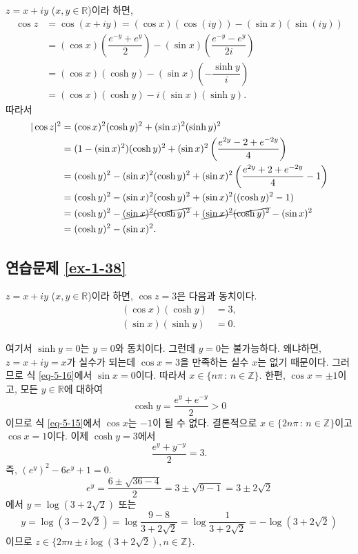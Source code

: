 $z=x+iy$ ($x,y\in\mathbb R$)이라 하면,
\begin{align*}
\cos z &= \cos(x+iy) = (\cos x)(\cos(iy)) - (\sin x)(\sin(iy)) \\
&= (\cos x)\left( \dfrac{e^{-y}+e^y}2\right)
- (\sin x)\left( \dfrac{e^{-y}-e^y}{2i}\right) \\
&= (\cos x)(\cosh y) - (\sin x)\left(-\dfrac{\sinh y}i\right) \\
&= (\cos x)(\cosh y) - i(\sin x)(\sinh y).
\end{align*}
따라서
\begin{align*}
|\cos z|^2 &= (\cos x)^2(\cosh y)^2 + (\sin x)^2(\sinh y)^2 \\
&= (1-(\sin x)^2)(\cosh y)^2 + (\sin x)^2\left(\dfrac{e^{2y} -2 + e^{-2y}}4\right) \\
&= (\cosh y)^2  - (\sin x)^2(\cosh y)^2 + (\sin x)^2
\left(\dfrac{e^{2y} + 2 + e^{-2y}}4 -1\right) \\
&= (\cosh y)^2  - (\sin x)^2(\cosh y)^2 + (\sin x)^2((\cosh y)^2-1) \\
&=  (\cosh y)^2  - \cancel{(\sin x)^2(\cosh y)^2} + \cancel{(\sin x)^2(\cosh y)^2}
-(\sin x)^2 \\
&= (\cosh y)^2 - (\sin x)^2.
\end{align*}

\subsection*{연습문제 \ref{ex-1-38}}

$z=x+iy$ ($x,y\in\mathbb R$)이라 하면,
$\cos z =3$은 다음과 동치이다.
\begin{align}
(\cos x)(\cosh y) &= 3, \label{eq-5-15} \\
(\sin x)(\sinh y) &= 0. \label{eq-5-16}
\end{align}

여기서 $\sinh y=0$는 $y=0$와 동치이다. 
그런데 $y=0$는 불가능하다.
왜냐하면, $z=x+iy=x$가 실수가 되는데 $\cos x =3$을 만족하는 실수 $x$는 없기 때문이다.
그러므로 식 \eqref{eq-5-16}에서 $\sin x = 0$이다.
따라서 $x \in \{ n\pi \,:\, n\in\mathbb Z\}$.
한편, $\cos x = \pm 1$이고, 모든 $y\in\mathbb R$에 대하여
\[
\cosh y = \dfrac{e^y + e^{-y}}2 > 0
\]
이므로 식 \eqref{eq-5-15}에서 $\cos x$는 $-1$이 될 수 없다.
결론적으로 $x \in \{ 2n\pi \,:\, n\in\mathbb Z\}$이고 $\cos x =1$이다.
이제 $\cosh y = 3$에서
\[
\dfrac{e^y + y^{-y}}2 = 3.
\]
즉, $(e^y)^2 - 6e^y+1=0$.
\[
e^y = \dfrac{6\pm \sqrt{36-4}}2 = 3 \pm \sqrt{9-1} = 3\pm 2\sqrt{2}
\]
에서 $y=\log(3+2\sqrt{2})$ 또는 
\[
y=\log(3-2\sqrt{2}) = \log\dfrac{9-8}{3+2\sqrt{2}} = \log \dfrac1{3+2\sqrt{2}} 
= -\log(3+2\sqrt{2})
\]
이므로
$z \in \{ 2\pi n \pm i \log(3+2\sqrt{2}), n\in\mathbb Z\}$.

